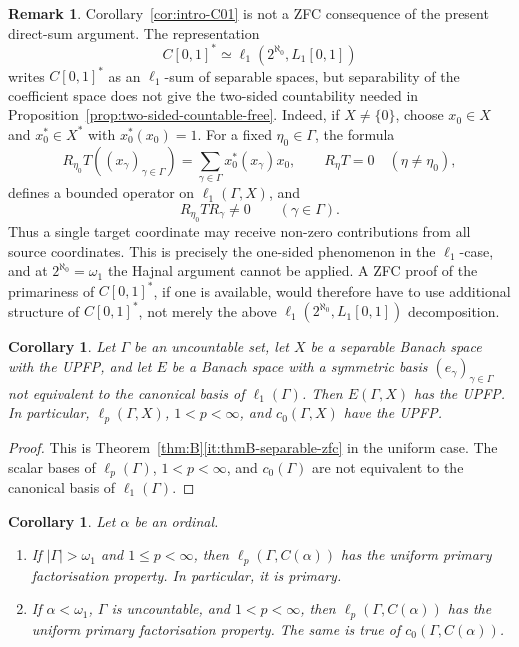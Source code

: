 \documentclass[11pt]{amsart}
\theoremstyle{plain}
\newtheorem{corollary}[theorem]{Corollary}
\theoremstyle{definition}
\newtheorem{remark}[theorem]{Remark}
\numberwithin{equation}{section}
\newcommand{\abs}[1]{\left|#1\right|}
\renewcommand{\le}{\leqslant}
\begin{document}
\begin{remark}\label{rem:c01-not-zfc-from-decomposition}
Corollary~\ref{cor:intro-C01} is not a ZFC consequence of the present direct-sum argument.  The representation
\[
    C[0,1]^*\simeq \ell_1(2^{\aleph_0},L_1[0,1])
\]
writes \(C[0,1]^*\) as an \(\ell_1\)-sum of separable spaces, but separability of the coefficient space does not give the two-sided countability needed in Proposition~\ref{prop:two-sided-countable-free}.  Indeed, if \(X\neq\{0\}\), choose \(x_0\in X\) and \(x_0^*\in X^*\) with \(x_0^*(x_0)=1\).  For a fixed \(\eta_0\in\Gamma\), the formula
\[
    R_{\eta_0}T((x_\gamma)_{\gamma\in\Gamma})
    =
    \sum_{\gamma\in\Gamma} x_0^*(x_\gamma)x_0,
    \qquad
    R_\eta T=0\quad(\eta\neq\eta_0),
\]
defines a bounded operator on \(\ell_1(\Gamma,X)\), and
\[
    R_{\eta_0}TR_\gamma\neq 0
    \qquad(\gamma\in\Gamma).
\]
Thus a single target coordinate may receive non-zero contributions from all source coordinates.  This is precisely the one-sided phenomenon in the \(\ell_1\)-case, and at \(2^{\aleph_0}=\omega_1\) the Hajnal argument cannot be applied.  A ZFC proof of the primariness of \(C[0,1]^*\), if one is available, would therefore have to use additional structure of \(C[0,1]^*\), not merely the above \(\ell_1(2^{\aleph_0},L_1[0,1])\) decomposition.
\end{remark}

\begin{corollary}\label{cor:separable-coeff-zfc}
Let \(\Gamma\) be an uncountable set, let \(X\) be a separable Banach space with the UPFP, and let \(E\) be a Banach space with a symmetric basis \((e_\gamma)_{\gamma\in\Gamma}\) not equivalent to the canonical basis of \(\ell_1(\Gamma)\).  Then \(E(\Gamma,X)\) has the UPFP.  In particular, \(\ell_p(\Gamma,X)\), \(1<p<\infty\), and \(c_0(\Gamma,X)\) have the UPFP.
\end{corollary}

\begin{proof}
This is Theorem~\ref{thm:B}\ref{it:thmB-separable-zfc} in the uniform case.  The scalar bases of \(\ell_p(\Gamma)\), \(1<p<\infty\), and \(c_0(\Gamma)\) are not equivalent to the canonical basis of \(\ell_1(\Gamma)\).
\end{proof}

\begin{corollary}\label{cor:intro-C02}
Let \(\alpha\) be an ordinal.
\begin{enumerate}[label=\textup{(\roman*)}, ref=\textup{(\roman*)}]
    \item\label{it:ordinal-large}
    If \(\abs{\Gamma}>\omega_1\) and \(1\le p<\infty\), then \(\ell_p(\Gamma,C(\alpha))\) has the uniform primary factorisation property.  In particular, it is primary.

    \item\label{it:ordinal-separable-zfc}
    If \(\alpha<\omega_1\), \(\Gamma\) is uncountable, and \(1<p<\infty\), then \(\ell_p(\Gamma,C(\alpha))\) has the uniform primary factorisation property.  The same is true of \(c_0(\Gamma,C(\alpha))\).
\end{enumerate}
\end{corollary}
\end{document}
